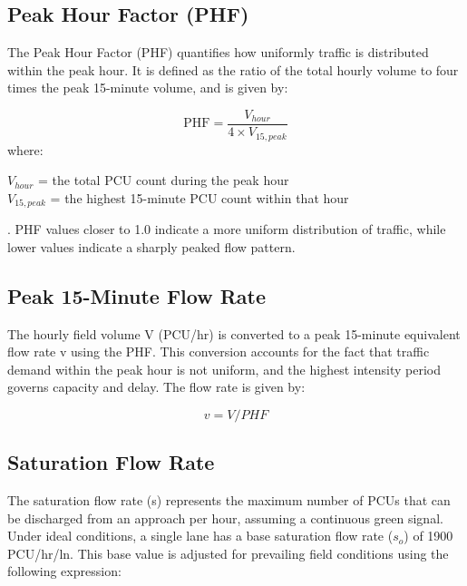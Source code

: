 \subsection{Peak Hour Factor (PHF)}
The Peak Hour Factor (PHF) quantifies how uniformly 
traffic is distributed within the peak hour. It is 
defined as the ratio of the total hourly volume to 
four times the peak 15-minute volume, and is given by:

\begin{equation}
    \text{PHF} = \frac{V_{hour}}{4 \times V_{15,peak}}  
\end{equation}
where:


$V_{hour}$ = the total PCU count during the peak hour\\
$V_{15,peak}$ = the highest 15-minute PCU count within that hour

. PHF values closer to 1.0 indicate a more uniform distribution of traffic, 
while lower values indicate a sharply peaked flow pattern.



\subsection{Peak 15-Minute Flow Rate}

The hourly field volume V (PCU/hr) is converted to a peak 15-minute 
equivalent flow rate v using the PHF. This conversion accounts 
for the fact that traffic demand within the peak hour 
is not uniform, and the highest intensity period 
governs capacity and delay. The flow rate is given by:

\begin{equation}
    v = V / PHF
\end{equation}


\subsection{Saturation Flow Rate}

The saturation flow rate (s) represents the maximum 
number of PCUs that can be discharged from an approach 
per hour, assuming a continuous green signal. Under 
ideal conditions, a single lane has a base saturation 
flow rate ($s_o$) of 1900 PCU/hr/ln. This base value is 
adjusted for prevailing field conditions using the 
following expression:


